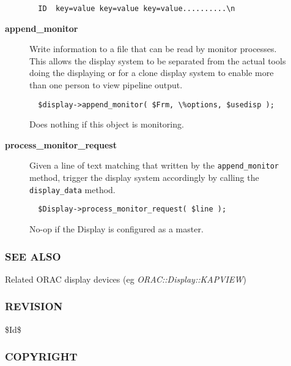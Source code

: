 \begin{description}
\begin{description}
\begin{verbatim}
  ID  key=value key=value key=value..........\n
\end{verbatim}

\item[{\textbf{append\_monitor}}] \mbox{}

Write information to a file that can be read by monitor processes. This allows the
display system to be separated from the actual tools doing the displaying or for
a clone display system to enable more than one person to view pipeline output.

\begin{verbatim}
  $display->append_monitor( $Frm, \%options, $usedisp );
\end{verbatim}


Does nothing if this object is monitoring.


\item[{\textbf{process\_monitor\_request}}] \mbox{}

Given a line of text matching that written by the \texttt{append\_monitor} method,
trigger the display system accordingly by calling the \texttt{display\_data} method.

\begin{verbatim}
  $Display->process_monitor_request( $line );
\end{verbatim}


No-op if the Display is configured as a master.

\end{description}
\subsubsection*{SEE ALSO\label{ORAC::Display_SEE_ALSO}}


Related ORAC display devices (eg \emph{ORAC::Display::KAPVIEW})

\subsubsection*{REVISION\label{ORAC::Display_REVISION}}


\$Id\$

\subsubsection*{COPYRIGHT\label{ORAC::Display_COPYRIGHT}}



\end{description}
